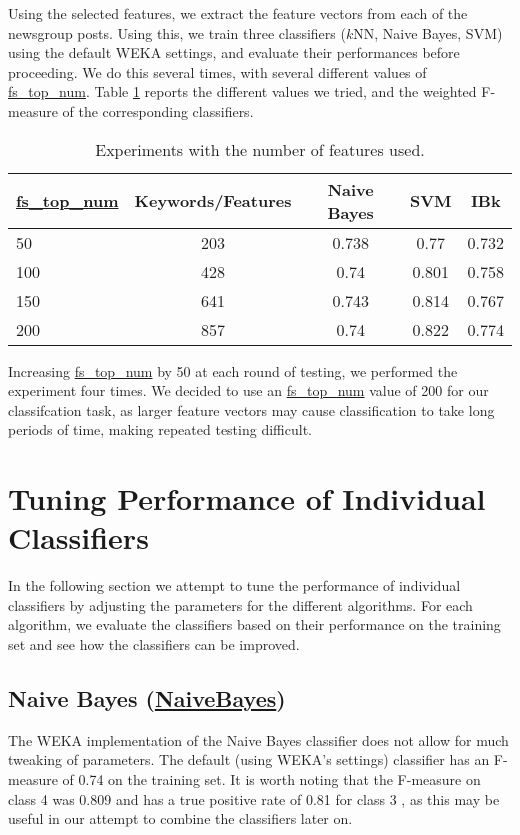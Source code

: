 \documentclass[12pt]{article}
\begin{document}
Using the selected features, we extract the feature vectors from each of the newsgroup posts. Using this, we train three classifiers ($k$NN, Naive Bayes, SVM) using the default WEKA settings, and evaluate their performances before proceeding. We do this several times, with several different values of \url{fs_top_num}. Table \ref{table:fs} reports the different values we tried, and the weighted F-measure of the corresponding classifiers.
\begin{table}[h]
\label{table:fs}
\centering
\begin{tabular}{|l|c| c c c |}
\hline 
	\url{fs_top_num} & Keywords/Features   & \textbf{Naive Bayes}& \textbf{SVM} & \textbf{IBk} \\
\hline
	50	& 203	& 0.738 & 0.77 	& 0.732 \\
	100	& 428   & 0.74	& 0.801	& 0.758	\\
	150 & 641	& 0.743 & 0.814 & 0.767 \\
	200 & 857	& 0.74	& 0.822 & 0.774 \\
\hline
\end{tabular}
\caption{Experiments with the number of features used.}
\end{table}

Increasing \url{fs_top_num} by 50 at each round of testing, we performed the experiment four times. We decided to use an \url{fs_top_num} value of 200 for our classifcation task, as larger feature vectors may cause classification to take long periods of time, making repeated testing difficult. 	
	
	



\section{Tuning Performance of Individual Classifiers}
In the following section we attempt to tune the performance of individual classifiers by adjusting the parameters for the different algorithms. For each algorithm, we evaluate the classifiers based on their performance on the training set and see how the classifiers can be improved.
\subsection{Naive Bayes (\url{NaiveBayes})}
The WEKA implementation of the Naive Bayes classifier does not allow for much tweaking of parameters. The default (using WEKA's settings) classifier has an  F-measure of 0.74 on the training set. It is worth noting that the F-measure on class 4 was 0.809 and has a true positive rate of 0.81 for class 3 , as this may be useful in our attempt to combine the classifiers later on.
\end{document}
